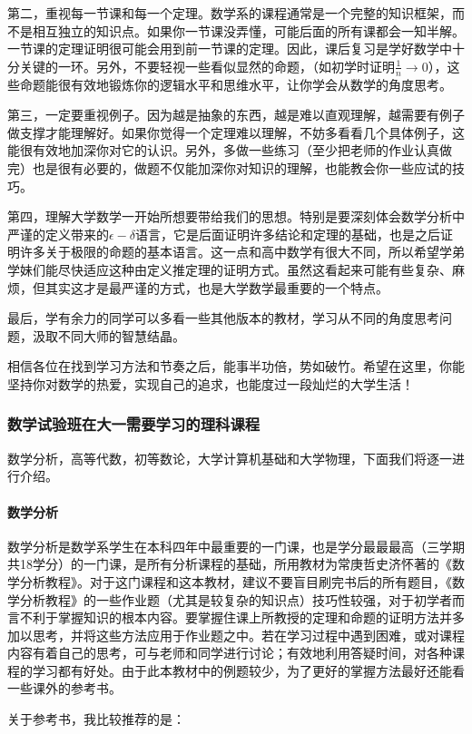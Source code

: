 \documentclass[
decoration,  %
]{qyxf-book}
\begin{document}
第二，重视每一节课和每一个定理。数学系的课程通常是一个完整的知识框架，而不是相互独立的知识点。如果你一节课没弄懂，可能后面的所有课都会一知半解。一节课的定理证明很可能会用到前一节课的定理。因此，课后复习是学好数学中十分关键的一环。另外，不要轻视一些看似显然的命题，（如初学时证明\(\frac 1 n\to 0\)），这些命题能很有效地锻炼你的逻辑水平和思维水平，让你学会从数学的角度思考。

第三，一定要重视例子。因为越是抽象的东西，越是难以直观理解，越需要有例子做支撑才能理解好。如果你觉得一个定理难以理解，不妨多看看几个具体例子，这能很有效地加深你对它的认识。另外，多做一些练习（至少把老师的作业认真做完）也是很有必要的，做题不仅能加深你对知识的理解，也能教会你一些应试的技巧。

第四，理解大学数学一开始所想要带给我们的思想。特别是要深刻体会数学分析中严谨的定义带来的$\epsilon-\delta$语言，它是后面证明许多结论和定理的基础，也是之后证明许多关于极限的命题的基本语言。这一点和高中数学有很大不同，所以希望学弟学妹们能尽快适应这种由定义推定理的证明方式。虽然这看起来可能有些复杂、麻烦，但其实这才是最严谨的方式，也是大学数学最重要的一个特点。

最后，学有余力的同学可以多看一些其他版本的教材，学习从不同的角度思考问题，汲取不同大师的智慧结晶。

相信各位在找到学习方法和节奏之后，能事半功倍，势如破竹。希望在这里，你能坚持你对数学的热爱，实现自己的追求，也能度过一段灿烂的大学生活！

\subsubsection{数学试验班在大一需要学习的理科课程}
数学分析，高等代数，初等数论，大学计算机基础和大学物理，下面我们将逐一进行介绍。
\paragraph{数学分析}
数学分析是数学系学生在本科四年中最重要的一门课，也是学分最最最高（三学期共18学分）的一门课，是所有分析课程的基础，所用教材为常庚哲史济怀著的《数学分析教程》。对于这门课程和这本教材，建议不要盲目刷完书后的所有题目，《数学分析教程》的一些作业题（尤其是较复杂的知识点）技巧性较强，对于初学者而言不利于掌握知识的根本内容。要掌握住课上所教授的定理和命题的证明方法并多加以思考，并将这些方法应用于作业题之中。若在学习过程中遇到困难，或对课程内容有着自己的思考，可与老师和同学进行讨论；有效地利用答疑时间，对各种课程的学习都有好处。由于此本教材中的例题较少，为了更好的掌握方法最好还能看一些课外的参考书。

关于参考书，我比较推荐的是：
\end{document}
